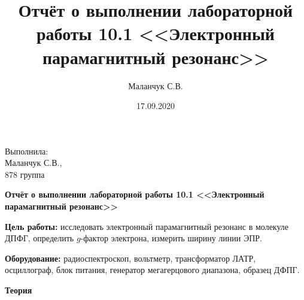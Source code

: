 \documentclass[12pt]{article}
\title{Отчёт о выполнении лабораторной работы 10.1 <<Электронный парамагнитный резонанс>>}
\author{Маланчук С.В.}
\date{17.09.2020}
\begin{document}
\begin{flushright}
    Выполнила:
    \\
    Маланчук С.В.,
    \\
    878 группа
\end{flushright}

\begin{center}
    \begin{Large}
        \textbf{Отчёт о выполнении лабораторной работы 10.1 <<Электронный парамагнитный резонанс>>}
    \end{Large}
\end{center}


\parindent=1cm \textbf{Цель работы:} исследовать электронный парамагнитный
резонанс в молекуле ДПФГ, определить $g$-фактор электрона, измерить ширину линии
ЭПР.

\parindent=1cm \textbf{Оборудование:} радиоспектроскоп, вольтметр, трансформатор
ЛАТР, осциллограф, блок питания, генератор мегагерцового диапазона, образец ДФПГ.
\begin{center}
    \textbf{Теория}
\end{center}
\end{document}
